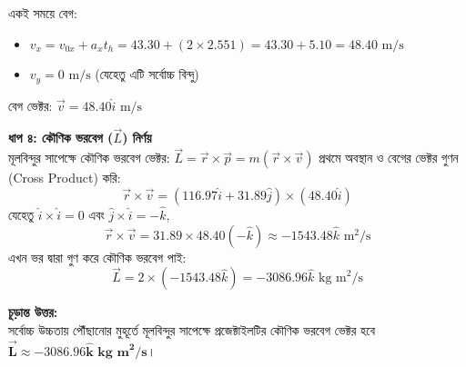 \documentclass[12pt, a4paper]{article}
\begin{document}
\begin{tcolorbox}[solutionbox={সমাধান (Solution)}]
একই সময়ে বেগ:
\begin{itemize}[leftmargin=*, parsep=0.5ex]
    \item $v_x = v_{0x} + a_x t_h = 43.30 + (2 \times 2.551) = 43.30 + 5.10 = 48.40\text{ m/s}$
    \item $v_y = 0\text{ m/s}$ (যেহেতু এটি সর্বোচ্চ বিন্দু)
\end{itemize}
বেগ ভেক্টর: $\vec{v} = 48.40\hat{i} \text{ m/s}$

\vspace{0.5em}
\noindent
\textbf{ধাপ ৪: কৌণিক ভরবেগ ($\vec{L}$) নির্ণয়} \\
মূলবিন্দুর সাপেক্ষে কৌণিক ভরবেগ ভেক্টর: $\vec{L} = \vec{r} \times \vec{p} = m (\vec{r} \times \vec{v})$
প্রথমে অবস্থান ও বেগের ভেক্টর গুণন (Cross Product) করি:
\[ \vec{r} \times \vec{v} = (116.97\hat{i} + 31.89\hat{j}) \times (48.40\hat{i}) \]
যেহেতু $\hat{i} \times \hat{i} = 0$ এবং $\hat{j} \times \hat{i} = -\hat{k}$,
\[ \vec{r} \times \vec{v} = 31.89 \times 48.40 (-\hat{k}) \approx -1543.48\hat{k} \text{ m}^2/\text{s} \]
এখন ভর দ্বারা গুণ করে কৌণিক ভরবেগ পাই:
\[ \vec{L} = 2 \times (-1543.48\hat{k}) = -3086.96\hat{k} \text{ kg m}^2/\text{s} \]

\vspace{1em}
\begin{tcolorbox}[answerbox]
\textbf{চূড়ান্ত উত্তর:} \\
সর্বোচ্চ উচ্চতায় পৌঁছানোর মুহূর্তে মূলবিন্দুর সাপেক্ষে প্রজেক্টাইলটির কৌণিক ভরবেগ ভেক্টর হবে $\mathbf{\vec{L} \approx -3086.96\hat{k} \text{ kg m}^2/\text{s}}$।
\end{tcolorbox}
\end{tcolorbox}
\end{document}
